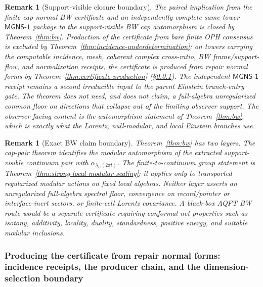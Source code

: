 \documentclass[11pt]{article}
\newtheorem{remark}[theorem]{Remark}
\begin{document}
\begin{remark}[Support-visible closure boundary]
The paired implication from the finite cap-normal BW certificate and an independently complete
same-tower \(\mathsf{MGNS\text{-}1}\) package to the support-visible BW cap automorphism is closed
by Theorem~\ref{thm:bw}. Production of the certificate from bare finite OPH consensus is excluded
by Theorem~\ref{thm:incidence-underdetermination}; on towers carrying the computable incidence,
mesh, coherent complex cross-ratio, BW frame/support-flow, and normalization receipts,
the certificate is produced from repair normal forms
by Theorem~\ref{thm:certificate-production}
(\S\ref{subsec:quotient-intrinsic-geometry-producer}). The independent \(\mathsf{MGNS\text{-}1}\)
receipt remains a second irreducible input to the parent Einstein branch-entry gate. The theorem
does not need, and does not claim, a full-algebra
unregularized common floor on directions that collapse out of the limiting observer support. The
observer-facing content is the automorphism statement of Theorem~\ref{thm:bw}, which is exactly
what the Lorentz, null-modular, and local Einstein branches use.
\end{remark}

\begin{remark}[Exact BW claim boundary]\label{rem:bw-stronger-not-claimed}
Theorem~\ref{thm:bw} has two layers. The cap-pair theorem identifies the modular automorphism of
the extracted support-visible continuum pair with \(\alpha_{\lambda_C(2\pi t)}\). The
finite-to-continuum group statement is Theorem~\ref{thm:strong-local-modular-scaling}; it applies
only to transported regularized modular actions on fixed local algebras. Neither layer asserts an
unregularized full-algebra spectral floor, convergence on record/pointer or interface-inert
sectors, or finite-cell Lorentz covariance. A black-box AQFT BW route would be a separate
certificate requiring conformal-net properties such as isotony, additivity, locality, duality,
standardness, positive energy, and suitable modular inclusions.
\end{remark}

\subsubsection{Producing the certificate from repair normal forms: incidence receipts, the producer chain, and the dimension-selection boundary}
\label{subsec:quotient-intrinsic-geometry-producer}
\end{document}
